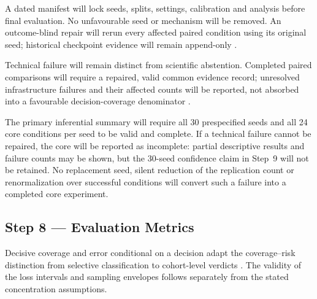 \documentclass[11pt,a4paper]{article}
\begin{document}
A dated manifest will lock seeds, splits, settings, calibration and analysis
before final evaluation. No unfavourable seed or mechanism will be removed.
An outcome-blind repair will rerun every affected paired condition using its
original seed; historical checkpoint evidence will remain append-only
\cite{nist,awsjoin}.

Technical failure will remain distinct from scientific abstention. Completed
paired comparisons will require a repaired, valid common evidence record;
unresolved infrastructure failures and their affected counts will be reported,
not absorbed into a favourable decision-coverage denominator
\cite{nist,souza}.

The primary inferential summary will require all 30 prespecified seeds and
all 24 core conditions per seed to be valid and complete. If a technical
failure cannot be repaired, the core will be reported as incomplete: partial
descriptive results and failure counts may be shown, but the 30-seed confidence
claim in Step~9 will not be retained. No replacement seed, silent reduction of
the replication count or renormalization over successful conditions will
convert such a failure into a completed core experiment.

\subsection*{Step 8 --- Evaluation Metrics}
Decisive coverage and error conditional on a decision adapt the
coverage--risk distinction from selective classification to cohort-level
verdicts \cite{selective}. The validity of the loss intervals and sampling
envelopes follows separately from the stated concentration assumptions.
\end{document}
